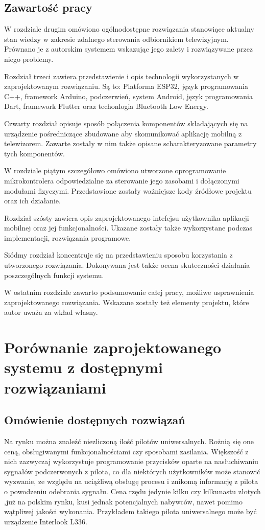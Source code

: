 \documentclass[12pt,twoside]{article}
\begin{document}
\subsection{Zawartość pracy}
W rozdziale drugim  omówiono ogólnodostępne rozwiązania stanowiące aktualny stan wiedzy w zakresie zdalnego sterowania odbiornikiem telewizyjnym. Prównano je z autorskim systemem wskazując jego zalety i rozwiązywane przez niego problemy.

Rozdział trzeci zawiera przedstawienie i opis technologii wykorzystanych w zaprojektowanym rozwiązaniu.  Są to: Platforma ESP32, język programowania C++, framework Arduino, podczerwień, system Android, język programowania Dart, framework Flutter oraz techonlogia Bluetooth Low Energy.

Czwarty rozdział opisuje sposób połączenia komponentów składających się na urządzenie pośredniczące zbudowane aby skomunikować aplikację mobilną z telewizorem. Zawarte zostały w nim także opisane scharakteryzowane parametry tych komponentów.

W rozdziale piątym szczegółowo omówiono utworzone oprogramowanie mikrokontrolera odpowiedzialne za sterowanie jego zasobami i dołączonymi modułami fizyczymi. Przedstawione zostały ważniejsze kody źródłowe projektu oraz ich działanie.

Rozdział szósty zawiera opis zaprojektowanego intefejsu użytkownika aplikacji mobilnej oraz jej funkcjonalności. Ukazane zostały także wykorzystane podczas implementacji, rozwiązania programowe.

Siódmy rozdział koncentruje się na przedstawieniu sposobu korzystania z utworzonego rozwiązania. Dokonywana jest także ocena skuteczności działania poszczególnych funkcji systemu.

W ostatnim rozdziale zawarto podsumowanie całej pracy, możliwe usprawnienia zaprojektowanego rozwiązania. Wskazane zostały też elementy projektu, które autor uważa za wkład własny.


\clearpage
\section{Porównanie zaprojektowanego systemu z do\-stęp\-ny\-mi rozwiązaniami}
\subsection{Omówienie dostępnych rozwiązań}
Na rynku można znaleźć niezliczoną ilość pilotów uniwersalnych. Rożnią się one
ceną, obsługiwanymi funkcjonalnościami czy sposobami zasilania. Większość z nich zazwyczaj
wykorzystuje programowanie przycisków oparte na nasłuchiwaniu sygnałów podczerwonych z pilota, co dla niektórych użytkowników może stanowić
wyzwanie, ze względu na uciążliwą obsługę procesu i znikomą informację z pilota o powodzeniu odebrania sygnału. Cena rzędu jedynie kilku czy kilkunastu złotych
,już na polskim rynku, kusi jednak potencjalnych nabywców, nawet pomimo wątpliwej jakości wykonania. Przykładem
takiego pilota uniwersalnego może być urządzenie Interlook L336\cite{cheapController}.
\end{document}
